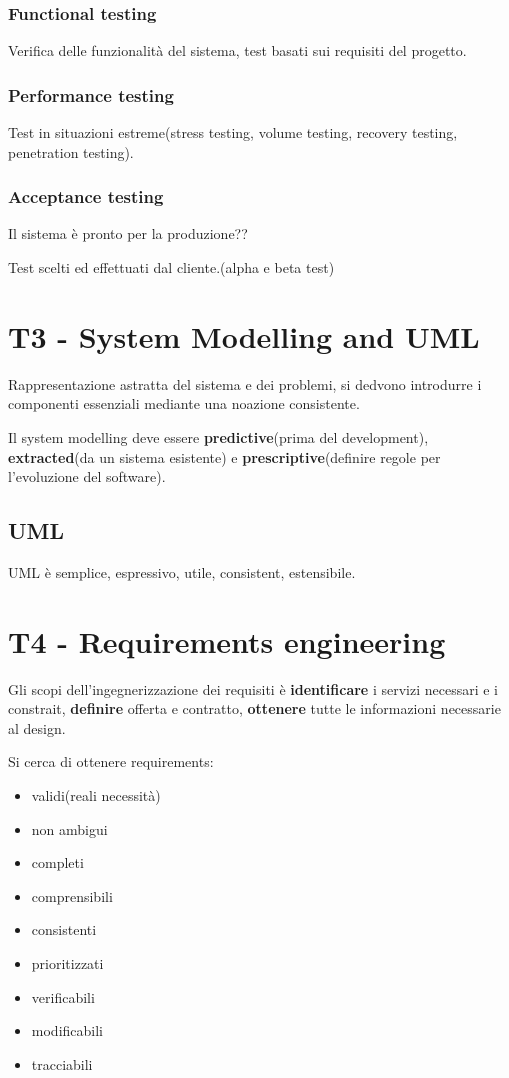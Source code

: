 \documentclass{article}
\begin{document}
\subsubsection{Functional testing}

Verifica delle funzionalità del sistema, test basati sui requisiti del progetto.

\subsubsection{Performance testing}
Test in situazioni estreme(stress testing, volume testing, recovery testing, penetration testing).

\subsubsection{Acceptance testing}
Il sistema è pronto per la produzione??

Test scelti ed effettuati dal cliente.(alpha e beta test)

\section{T3 - System Modelling and UML}

Rappresentazione astratta del sistema e dei problemi, si dedvono introdurre i componenti essenziali mediante una noazione
consistente.

Il system modelling deve essere \textbf{predictive}(prima del development), \textbf{extracted}(da un sistema 
esistente) e \textbf{prescriptive}(definire regole per l'evoluzione del software).

\subsection{UML}
UML è semplice, espressivo, utile, consistent, estensibile.

\section{T4 - Requirements engineering}

Gli scopi dell'ingegnerizzazione dei requisiti è \textbf{identificare} i servizi necessari
e i constrait, \textbf{definire} offerta e contratto, \textbf{ottenere} tutte le informazioni
necessarie al design.

Si cerca di ottenere requirements:
\begin{itemize}
    \item validi(reali necessità)
    \item non ambigui
    \item completi
    \item comprensibili
    \item consistenti
    \item prioritizzati
    \item verificabili
    \item modificabili
    \item tracciabili
\end{itemize}
\end{document}
